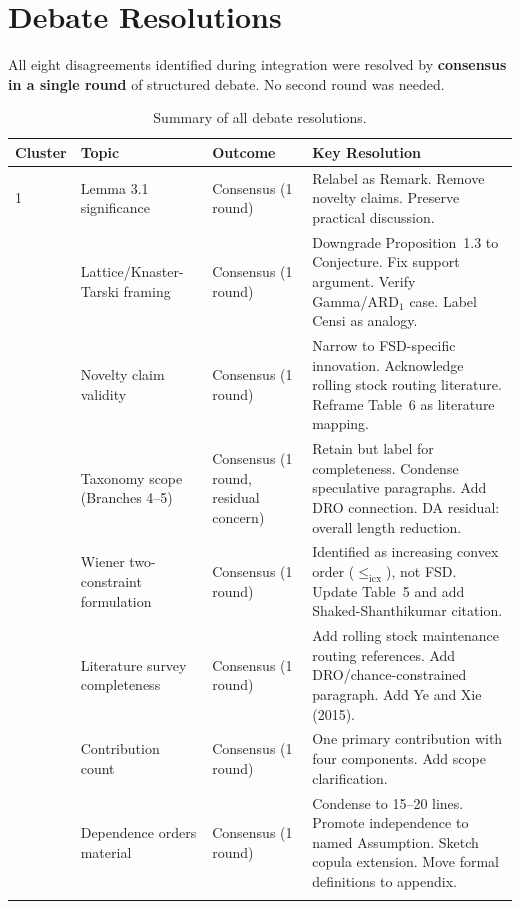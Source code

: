 \documentclass[11pt,a4paper]{article}
\begin{document}
\newpage
\section{Debate Resolutions}

All eight disagreements identified during integration were resolved by \textbf{consensus in a single round} of structured debate. No second round was needed.

\begin{longtable}{p{1.2cm}p{4cm}p{3.5cm}p{5cm}}
\toprule
\textbf{Cluster} & \textbf{Topic} & \textbf{Outcome} & \textbf{Key Resolution} \\
\midrule
\endhead
1 & Lemma 3.1 significance & Consensus (1 round) & Relabel as Remark. Remove novelty claims. Preserve practical discussion. \\
\addlinespace
2 & Lattice/Knaster-Tarski framing & Consensus (1 round) & Downgrade Proposition~1.3 to Conjecture. Fix support argument. Verify Gamma/ARD$_1$ case. Label Censi as analogy. \\
\addlinespace
3 & Novelty claim validity & Consensus (1 round) & Narrow to FSD-specific innovation. Acknowledge rolling stock routing literature. Reframe Table~6 as literature mapping. \\
\addlinespace
4 & Taxonomy scope (Branches 4--5) & Consensus (1 round, residual concern) & Retain but label for completeness. Condense speculative paragraphs. Add DRO connection. DA residual: overall length reduction. \\
\addlinespace
5 & Wiener two-constraint formulation & Consensus (1 round) & Identified as increasing convex order ($\le_{\mathrm{icx}}$), not FSD. Update Table~5 and add Shaked-Shanthikumar citation. \\
\addlinespace
6 & Literature survey completeness & Consensus (1 round) & Add rolling stock maintenance routing references. Add DRO/chance-constrained paragraph. Add Ye and Xie (2015). \\
\addlinespace
7 & Contribution count & Consensus (1 round) & One primary contribution with four components. Add scope clarification. \\
\addlinespace
8 & Dependence orders material & Consensus (1 round) & Condense to 15--20 lines. Promote independence to named Assumption. Sketch copula extension. Move formal definitions to appendix. \\
\bottomrule
\caption{Summary of all debate resolutions.}
\end{longtable}
\end{document}
